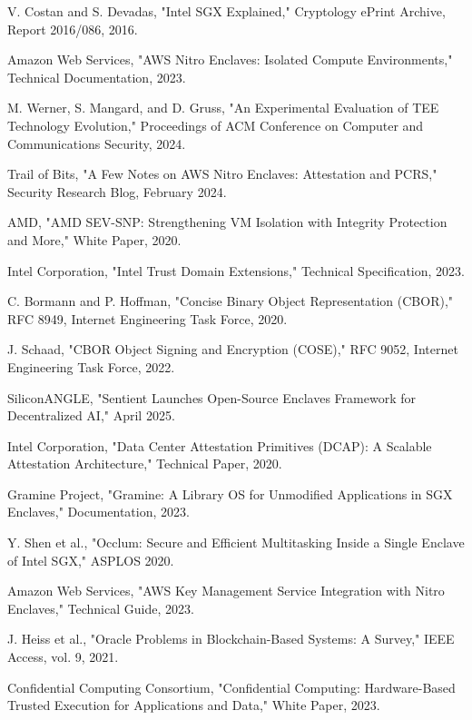 \documentclass[12pt,a4paper]{article}
\begin{document}
\begin{thebibliography}{99}

V. Costan and S. Devadas, "Intel SGX Explained," Cryptology ePrint Archive, Report 2016/086, 2016.

Amazon Web Services, "AWS Nitro Enclaves: Isolated Compute Environments," Technical Documentation, 2023.

M. Werner, S. Mangard, and D. Gruss, "An Experimental Evaluation of TEE Technology Evolution," Proceedings of ACM Conference on Computer and Communications Security, 2024.

Trail of Bits, "A Few Notes on AWS Nitro Enclaves: Attestation and PCRS," Security Research Blog, February 2024.

AMD, "AMD SEV-SNP: Strengthening VM Isolation with Integrity Protection and More," White Paper, 2020.

Intel Corporation, "Intel Trust Domain Extensions," Technical Specification, 2023.

C. Bormann and P. Hoffman, "Concise Binary Object Representation (CBOR)," RFC 8949, Internet Engineering Task Force, 2020.

J. Schaad, "CBOR Object Signing and Encryption (COSE)," RFC 9052, Internet Engineering Task Force, 2022.

SiliconANGLE, "Sentient Launches Open-Source Enclaves Framework for Decentralized AI," April 2025.

Intel Corporation, "Data Center Attestation Primitives (DCAP): A Scalable Attestation Architecture," Technical Paper, 2020.

Gramine Project, "Gramine: A Library OS for Unmodified Applications in SGX Enclaves," Documentation, 2023.

Y. Shen et al., "Occlum: Secure and Efficient Multitasking Inside a Single Enclave of Intel SGX," ASPLOS 2020.

Amazon Web Services, "AWS Key Management Service Integration with Nitro Enclaves," Technical Guide, 2023.

J. Heiss et al., "Oracle Problems in Blockchain-Based Systems: A Survey," IEEE Access, vol. 9, 2021.

Confidential Computing Consortium, "Confidential Computing: Hardware-Based Trusted Execution for Applications and Data," White Paper, 2023.


\end{thebibliography}
\end{document}
